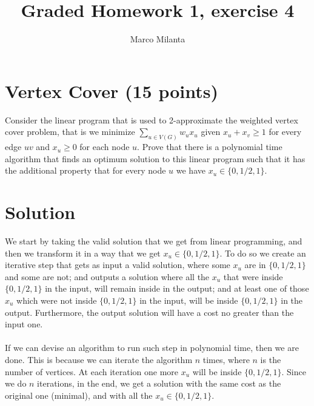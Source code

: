 \documentclass[11pt]{article}
\begin{document}
\author{Marco Milanta}
\title{Graded Homework 1, exercise 4}
\maketitle


\section*{Vertex Cover (15 points)}%
    Consider the linear program that is used to 2-approximate the weighted vertex cover problem, that is we minimize $\sum_{u \in V(G)} w_u x_u$ given $x_u + x_v  \geq 1$ for every edge $uv$ and $x_u \ge 0$ for each node $u$. 
    Prove that there is a polynomial time algorithm that finds an optimum solution to this linear program such that it has the additional property that for every node $u$ we have $x_u \in \{0, 1/2, 1 \}$. 
    \section*{Solution}
    We start by taking the valid solution that we get from linear programming, and then we transform it in a way that we get $x_u \in \{0,1/2,1\}$. To do so we create an iterative step that gets as input a valid solution, where some $x_u$ are in $\{0,1/2,1\}$ and some are not; and outputs a solution where all the $x_u$ that were inside $\{0,1/2,1\}$ in the input, will remain inside in the output; and at least one of those $x_u$ which were not inside $\{0,1/2,1\}$ in the input, will be inside $\{0,1/2,1\}$ in the output. Furthermore, the output solution will have a cost no greater than the input one. \\\\
    If we can devise an algorithm to run such step in polynomial time, then we are done. This is because we can iterate the algorithm $n$ times, where $n$ is the number of vertices. At each iteration one more $x_u$ will be inside $\{0,1/2,1\}$. Since we do $n$ iterations, in the end, we get a solution with the same cost as the original one (minimal), and with all the $x_u\in\{0,1/2,1\}$.
\end{document}
